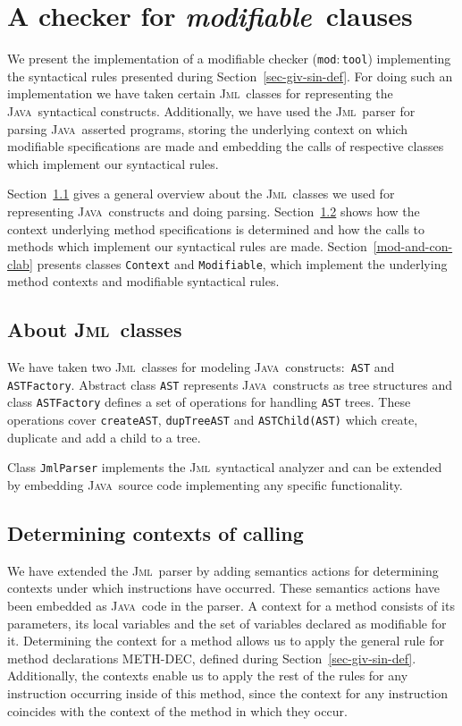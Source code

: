 \documentclass[a4paper]{llncs}
\newcommand{\jml}{\textsc{Jml}}
\newcommand{\java}{\textsc{Java}}
\newcommand{\modtool}{\texttt{mod$:$tool}}
\newcommand{\modif}{\textit{modifiable}}
\begin{document}
\section{A checker for \modif~clauses}
\label{sec-imp-iss}
We present the implementation of a modifiable checker (\modtool)
implementing the syntactical rules presented during
Section~\ref{sec-giv-sin-def}. For doing such an implementation we
have taken certain \jml~classes for representing the \java~syntactical 
constructs. Additionally, we have used the \jml~parser for parsing
\java~asserted programs, storing the underlying context on which
modifiable specifications are made and embedding the calls of
respective classes which implement our syntactical rules.

Section~\ref{abo-jml-cla-use} gives a general overview about the
\jml~classes we used for representing \java~constructs and doing
parsing. Section~\ref{fig-out-met-cal-con} shows how the
context underlying method specifications is determined and how
the calls to methods which implement our syntactical
rules are made. Section~\ref{mod-and-con-clab} presents classes
\texttt{Context} and \texttt{Modifiable}, which implement the
underlying method contexts and modifiable syntactical rules.




\subsection{About \jml~classes}
\label{abo-jml-cla-use}
We have taken two \jml~classes for modeling \java~constructs$:$
\texttt{AST} and \texttt{ASTFactory}. Abstract class \texttt{AST}
represents \java~constructs as tree structures and class
\texttt{ASTFactory} defines a set of operations for handling
\texttt{AST} trees. These operations cover \texttt{create{AST}},
\texttt{dupTree{AST}} and \texttt{ASTChild(AST)} which create,
duplicate and add a child to a tree.

Class \texttt{JmlParser} implements the \jml~syntactical analyzer and
can be extended by embedding \java~source code implementing any
specific functionality.

\subsection{Determining contexts of calling}
\label{fig-out-met-cal-con}
We have extended the \jml~parser by adding semantics actions for
determining contexts under which instructions have occurred. These
semantics actions have been embedded as \java~code in the parser. A
context for a method consists of its parameters, its local variables
and the set of variables declared as modifiable for it. Determining
the context for a method allows us to apply the general rule for method
declarations \textup{METH-DEC}, defined during
Section~\ref{sec-giv-sin-def}. Additionally, the contexts enable us to
apply the rest of the rules
for any instruction occurring inside of this method, since the context
for any instruction coincides with the context of the method in which
they occur.
\end{document}
